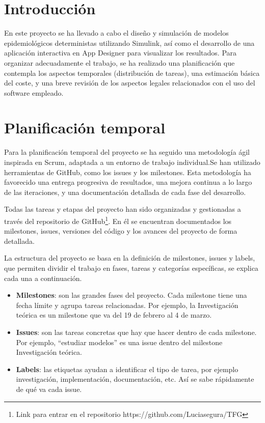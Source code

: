 
\section{Introducción}
En este proyecto se ha llevado a cabo el diseño y simulación de modelos epidemiológicos deterministas utilizando Simulink, así como el desarrollo de una aplicación interactiva en App Designer para visualizar los resultados. Para organizar adecuadamente el trabajo, se ha realizado una planificación que contempla los aspectos temporales (distribución de tareas), una estimación básica del coste, y una breve revisión de los aspectos legales relacionados con el uso del software empleado.

\section{Planificación temporal}
Para la planificación temporal del proyecto se ha seguido una metodología ágil inspirada en Scrum, adaptada a un entorno de trabajo individual.Se han utilizado herramientas de GitHub, como los issues y los milestones. Esta metodología ha favorecido una entrega progresiva de resultados, una mejora continua a lo largo de las iteraciones, y una documentación detallada de cada fase del desarrollo.

Todas las tareas y etapas del proyecto han sido organizadas y gestionadas a través del repositorio de GitHub\footnote{Link para entrar en el repositorio https://github.com/Luciasegura/TFG}. En él se encuentran documentados los milestones, issues, versiones del código y los avances del proyecto de forma detallada.

La estructura del proyecto se basa en la definición de milestones, issues y labels, que permiten dividir el trabajo en fases, tareas y categorías específicas, se explica cada una a continuación.
\begin{itemize}
    \item \textbf{Milestones}: son las grandes fases del proyecto. Cada milestone tiene una fecha límite y agrupa tareas relacionadas. Por ejemplo, la Investigación teórica es un milestone que va del 19 de febrero al 4 de marzo.
    \item \textbf{Issues}: son las tareas concretas que hay que hacer dentro de cada milestone. Por ejemplo, “estudiar modelos” es una issue dentro del milestone Investigación teórica.
    \item \textbf{Labels}: las etiquetas ayudan a identificar el tipo de tarea, por ejemplo investigación, implementación, documentación, etc. Así se sabe rápidamente de qué va cada issue.
\end{itemize}




